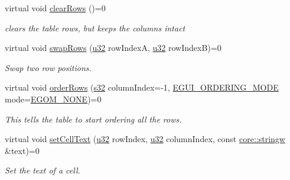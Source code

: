 \begin{DoxyCompactItemize}
virtual void \hyperlink{classirr_1_1gui_1_1IGUITable_a492adc813893d062f66c35dafa653fad}{clear\+Rows} ()=0
\begin{DoxyCompactList}\small\item\em clears the table rows, but keeps the columns intact \end{DoxyCompactList}\item 
\mbox{\label{classirr_1_1gui_1_1IGUITable_a9b54731c433912b00b3393c98a53ca68}} 
virtual void \hyperlink{classirr_1_1gui_1_1IGUITable_a9b54731c433912b00b3393c98a53ca68}{swap\+Rows} (\hyperlink{namespaceirr_a0416a53257075833e7002efd0a18e804}{u32} row\+IndexA, \hyperlink{namespaceirr_a0416a53257075833e7002efd0a18e804}{u32} row\+IndexB)=0
\begin{DoxyCompactList}\small\item\em Swap two row positions. \end{DoxyCompactList}\item 
virtual void \hyperlink{classirr_1_1gui_1_1IGUITable_a22ec8c1ee8e6a191b8bdcd741b0144f2}{order\+Rows} (\hyperlink{namespaceirr_ac66849b7a6ed16e30ebede579f9b47c6}{s32} column\+Index=-\/1, \hyperlink{namespaceirr_1_1gui_a577bf3aa30c2e3bde9aa3eaa2e4f16d3}{E\+G\+U\+I\+\_\+\+O\+R\+D\+E\+R\+I\+N\+G\+\_\+\+M\+O\+DE} mode=\hyperlink{namespaceirr_1_1gui_a577bf3aa30c2e3bde9aa3eaa2e4f16d3afc9617a9d7600ff2bea753c6fe060ad0}{E\+G\+O\+M\+\_\+\+N\+O\+NE})=0
\begin{DoxyCompactList}\small\item\em This tells the table to start ordering all the rows. \end{DoxyCompactList}\item 
\mbox{\label{classirr_1_1gui_1_1IGUITable_a4e2445949ad689a3afca73d693d01e9c}} 
virtual void \hyperlink{classirr_1_1gui_1_1IGUITable_a4e2445949ad689a3afca73d693d01e9c}{set\+Cell\+Text} (\hyperlink{namespaceirr_a0416a53257075833e7002efd0a18e804}{u32} row\+Index, \hyperlink{namespaceirr_a0416a53257075833e7002efd0a18e804}{u32} column\+Index, const \hyperlink{namespaceirr_1_1core_a5aedb62cb47cf01d1c548ab5e6344d2d}{core\+::stringw} \&text)=0
\begin{DoxyCompactList}\small\item\em Set the text of a cell. \end{DoxyCompactList}\item 
\mbox{\label{classirr_1_1gui_1_1IGUITable_ab23ea414e2a01dd8ed8b3ab659318653}} 

\end{DoxyCompactItemize}
